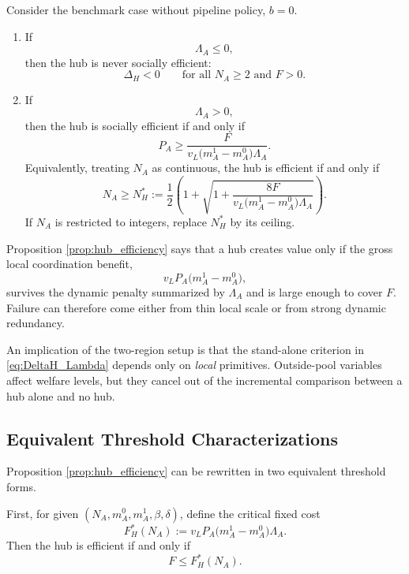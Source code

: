 \begin{proposition}
\label{prop:hub_efficiency}
Consider the benchmark case without pipeline policy, $b=0$.

\begin{enumerate}[leftmargin=2em]
    \item If
    \[
    \Lambda_A \le 0,
    \]
    then the hub is never socially efficient:
    \[
    \Delta_H < 0
    \qquad
    \text{for all } N_A \ge 2 \text{ and } F>0.
    \]

    \item If
    \[
    \Lambda_A > 0,
    \]
    then the hub is socially efficient if and only if
    \begin{equation}
    P_A
    \ge
    \frac{F}{v_L\bigl(m_A^1-m_A^0\bigr)\Lambda_A}.
    \label{eq:pair_threshold}
    \end{equation}
    Equivalently, treating $N_A$ as continuous, the hub is efficient if and only if
    \begin{equation}
    N_A \ge N_H^*
    :=
    \frac{1}{2}
    \left(
    1+
    \sqrt{
    1+
    \frac{8F}{v_L\bigl(m_A^1-m_A^0\bigr)\Lambda_A}
    }
    \right).
    \label{eq:Nstar}
    \end{equation}
    If $N_A$ is restricted to integers, replace $N_H^*$ by its ceiling.
\end{enumerate}
\end{proposition}

Proposition \ref{prop:hub_efficiency} says that a hub creates value only if the gross local coordination benefit,
\[
v_L P_A \bigl(m_A^1-m_A^0\bigr),
\]
survives the dynamic penalty summarized by $\Lambda_A$ and is large enough to cover $F$. Failure can therefore come either from thin local scale or from strong dynamic redundancy.

An implication of the two-region setup is that the stand-alone criterion in \eqref{eq:DeltaH_Lambda} depends only on \emph{local} primitives. Outside-pool variables affect welfare levels, but they cancel out of the incremental comparison between a hub alone and no hub.

\subsection{Equivalent Threshold Characterizations}

Proposition \ref{prop:hub_efficiency} can be rewritten in two equivalent threshold forms.

First, for given $(N_A,m_A^0,m_A^1,\beta,\delta)$, define the critical fixed cost
\begin{equation}
F_H^*(N_A)
:=
v_L P_A \bigl(m_A^1-m_A^0\bigr)\Lambda_A.
\label{eq:Fstar}
\end{equation}
Then the hub is efficient if and only if
\[
F \le F_H^*(N_A).
\]

